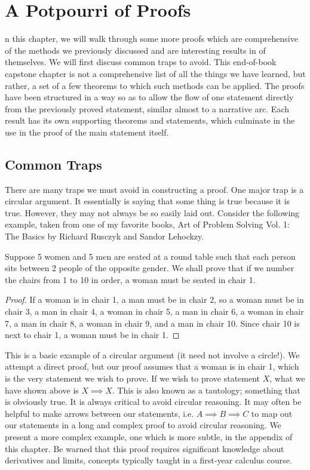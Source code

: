 \chapter{A Potpourri of Proofs}

n this chapter, we will walk through some more proofs which are comprehensive of the methods we previously discussed and are interesting results in of themselves. We will first discuss common traps to avoid. This end-of-book capstone chapter is not a comprehensive list of all the things we have learned, but rather, a set of a few theorems to which such methods can be applied. The proofs have been structured in a way so as to allow the flow of one statement directly from the previously proved statement, similar almost to a narrative arc. Each result has its own supporting theorems and statements, which culminate in the use in the proof of the main statement itself. 

\section{Common Traps}
There are many traps we must avoid in constructing a proof. One major trap is a circular argument. It essentially is saying that some thing is true because it is true. However, they may not always be so easily laid out. Consider the following example, taken from one of my favorite books, Art of Problem Solving Vol. 1: The Basics by Richard Rusczyk and Sandor Lehockzy. 
\begin{example}
Suppose 5 women and 5 men are seated at a round table such that each person sits between 2 people of the opposite gender. We shall prove that if we number the chairs from 1 to 10 in order, a woman must be seated in chair 1.
\end{example}
\begin{proof}
If a woman is in chair 1, a man must be in chair 2, so a woman must be in chair 3, a man in chair 4, a woman in chair 5, a man in chair 6, a woman in chair 7, a man in chair 8, a woman in chair 9, and a man in chair 10. Since chair 10 is next to chair 1, a woman must be in chair 1.
\end{proof}
This is a basic example of a circular argument (it need not involve a circle!). We attempt a direct proof, but our proof assumes that a woman is in chair 1, which is the very statement we wish to prove. If we wish to prove statement $X$, what we have shown above is $X \implies X$. This is also known as a tautology; something that is obviously true. It is always critical to avoid circular reasoning. It may often be helpful to make arrows between our statements, i.e. $A \implies B \implies C$ to map out our statements in a long and complex proof to avoid circular reasoning. We present a more complex example, one which is more subtle, in the appendix of this chapter. Be warned that this proof requires significant knowledge about derivatives and limits, concepts typically taught in a first-year calculus course.

